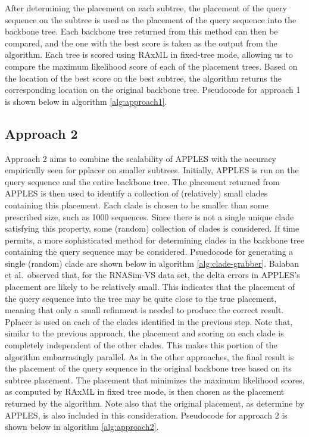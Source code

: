 \documentclass[11pt]{article}
\begin{document}
After determining the placement on each subtree, the placement of the
query sequence on the subtree is used as the placement of the query
sequence into the backbone tree. Each backbone tree returned from this
method can then be compared, and the one with the best score is taken as
the output from the algorithm. Each tree is scored using RAxML in
fixed-tree mode, allowing us to compare the maximum likelihood score of
each of the placement trees. Based on the location of the best score on
the best subtree, the algorithm returns the corresponding location on
the original backbone tree. Pseudocode for approach 1 is shown below in
algorithm \ref{alg:approach1}.

\subsection{Approach 2}

Approach 2 aims to combine the scalability of APPLES with the accuracy
empirically seen for pplacer on smaller subtrees. Initially, APPLES is
run on the query sequence and the entire backbone tree. The placement
returned from APPLES is then used to identify a collection of
(relatively) small clades containing this placement. Each clade is
chosen to be smaller than some prescribed size, such as 1000 sequences.
Since there is not a single unique clade satisfying this property, some
(random) collection of clades is considered. If time permits, a more
sophisticated method for determining clades in the backbone tree
containing the query sequence may be considered. Psuedocode for
generating a single (random) clade are shown below in algorithm
\ref{alg:clade-grabber}. Balaban et al.~observed that, for the RNASim-VS
data set, the delta errors in APPLES's placement are likely to be
relatively small. This indicates that the placement of the query
sequence into the tree may be quite close to the true placement, meaning
that only a small refinment is needed to produce the correct result.
Pplacer is used on each of the clades identified in the previous step.
Note that, similar to the previous approach, the placement and scoring
on each clade is completely independent of the other clades. This makes
this portion of the algorithm embarrasingly parallel. As in the other
approaches, the final result is the placement of the query sequence in
the original backbone tree based on its subtree placement. The placement
that minimizes the maximum likelihood scores, as computed by RAxML in
fixed tree mode, is then chosen as the placement returned by the
algorithm. Note also that the original placement, as determine by
APPLES, is also included in this consideration. Pseudocode for approach
2 is shown below in algorithm \ref{alg:approach2}.
\end{document}
